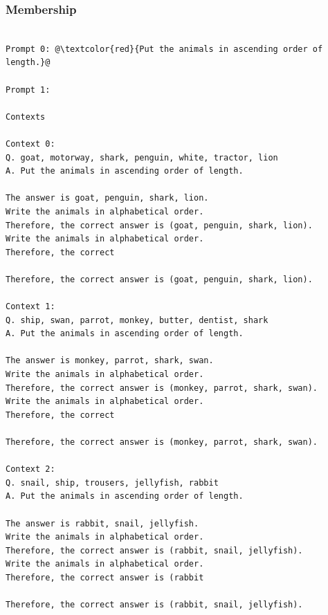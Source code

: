 \documentclass{article} %
\begin{document}
\subsubsection{Membership}
\begin{tcolorbox}
\begin{lstlisting}[escapechar=@]

Prompt 0: @\textcolor{red}{Put the animals in ascending order of length.}@

Prompt 1:

Contexts

Context 0:
Q. goat, motorway, shark, penguin, white, tractor, lion
A. Put the animals in ascending order of length.

The answer is goat, penguin, shark, lion.
Write the animals in alphabetical order.
Therefore, the correct answer is (goat, penguin, shark, lion).
Write the animals in alphabetical order.
Therefore, the correct

Therefore, the correct answer is (goat, penguin, shark, lion).

Context 1:
Q. ship, swan, parrot, monkey, butter, dentist, shark
A. Put the animals in ascending order of length.

The answer is monkey, parrot, shark, swan.
Write the animals in alphabetical order.
Therefore, the correct answer is (monkey, parrot, shark, swan).
Write the animals in alphabetical order.
Therefore, the correct

Therefore, the correct answer is (monkey, parrot, shark, swan).

Context 2:
Q. snail, ship, trousers, jellyfish, rabbit
A. Put the animals in ascending order of length.

The answer is rabbit, snail, jellyfish.
Write the animals in alphabetical order.
Therefore, the correct answer is (rabbit, snail, jellyfish).
Write the animals in alphabetical order.
Therefore, the correct answer is (rabbit

Therefore, the correct answer is (rabbit, snail, jellyfish).
\end{lstlisting}
\end{tcolorbox}
\end{document}
